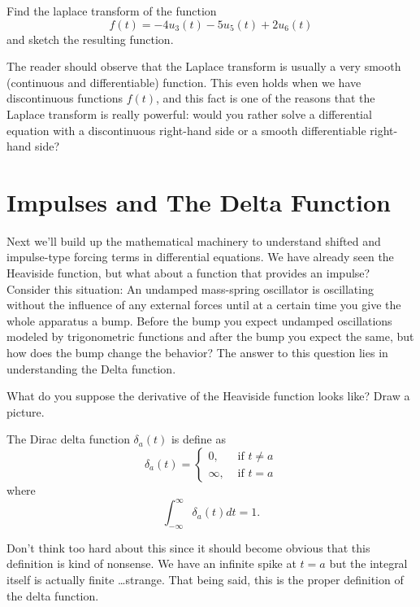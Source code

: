 \begin{problem}
    Find the laplace transform of the function 
    \[ f(t) = -4 u_3(t) - 5 u_5(t) + 2 u_6(t) \]
    and sketch the resulting function.
\end{problem}

The reader should observe that the Laplace transform is usually a very smooth (continuous
and differentiable) function.  This even holds when we have discontinuous functions
$f(t)$, and this fact is one of the reasons that the Laplace transform is really powerful:
would you rather solve a differential equation with a discontinuous right-hand side or a
smooth differentiable right-hand side?

\section{Impulses and The Delta Function}

Next we'll build up the mathematical machinery to understand shifted and impulse-type
forcing terms in differential equations.  We have already seen the Heaviside function, but
what about a function that provides an impulse?  Consider this situation: An undamped mass-spring
oscillator is oscillating without the influence of any external forces until at a certain
time you give the whole apparatus a bump.  Before the bump you expect undamped
oscillations modeled by trigonometric functions and after the bump you expect the same,
but how does the bump change the behavior?  The answer to this question lies in
understanding the Delta function. 

\begin{problem}
    What do you suppose the derivative of the Heaviside function looks like?  Draw a picture.
\end{problem}

\begin{definition}
    The Dirac delta function $\delta_a(t)$ is define as
    \[ \delta_a(t) = \left\{ \begin{array}{cc} 0, & \text{ if } t \neq a \\ \infty, &
            \text{ if } t=a \end{array} \right. \]
    where 
    \[ \int_{-\infty}^\infty \delta_a(t) dt = 1. \]
\end{definition}
Don't think too hard about this since it should become obvious that this definition is
kind of nonsense.  We have an infinite spike at $t=a$ but the integral itself is actually
finite \ldots strange. That being said, this is the proper definition of the delta
function.


